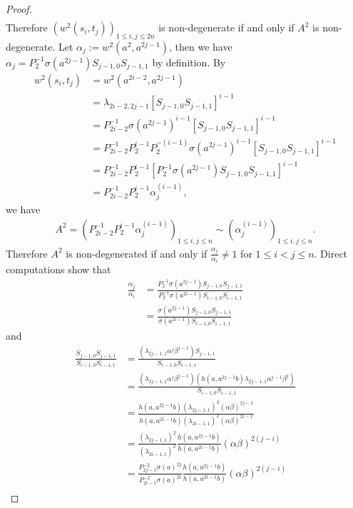\documentclass[a4paper,11pt]{amsart}
\numberwithin{equation}{section}
\begin{document}
\begin{proof}
\begin{gather*}
\end{gather*}
Therefore $(w^2(s_i,t_j))_{1\leq i,j \leq 2n}$ is non-degenerate if and only if $A^2$ is non-degenerate. Let $\alpha_j:=w^2(a^2,a^{2j-1})$, then we have $\alpha_j=P_{2}^{-1}\sigma(a^{2j-1}) S_{j-1,0} S_{j-1,1}$ by definition. By
\begin{align*}
w^2(s_{i},t_{j})&=w^2(a^{2i-2},a^{2j-1})\\
&=\lambda_{2i-2,2j-1}[S_{j-1,0} S_{j-1,1}]^{i-1}\\
&=P_{2i-2}^{-1} \sigma(a^{2j-1})^{i-1} [S_{j-1,0} S_{j-1,1}]^{i-1}\\
&=P_{2i-2}^{-1} P_{2}^{i-1} P_{2}^{-(i-1)}\sigma(a^{2j-1})^{i-1} [S_{j-1,0} S_{j-1,1}]^{i-1}\\
&=P_{2i-2}^{-1} P_{2}^{i-1} [P_{2}^{-1}\sigma(a^{2j-1}) S_{j-1,0} S_{j-1,1}]^{i-1}\\
&=P_{2i-2}^{-1} P_{2}^{i-1} \alpha_j^{(i-1)},
\end{align*}
we have
\begin{gather*}
A^2= (P_{2i-2}^{-1} P_{2}^{i-1} \alpha_j^{(i-1)})_{1 \leq i,j \leq n} \sim (\alpha_j^{(i-1)})_{1 \leq i,j \leq n}.
\end{gather*}
Therefore $A^2$ is non-degenerated if and only if $\frac{\alpha_j}{\alpha_i}\neq 1$ for $1\leq i < j\leq n$. Direct computations show that
\begin{align*}
\frac{\alpha_j}{\alpha_i}&=\frac{P_{2}^{-1}\sigma(a^{2j-1}) S_{j-1,0} S_{j-1,1}}{P_{2}^{-1}\sigma(a^{2i-1}) S_{i-1,0} S_{i-1,1}}\\
&=\frac{\sigma(a^{2j-1}) S_{j-1,0} S_{j-1,1}}{\sigma(a^{2i-1}) S_{i-1,0} S_{i-1,1}}
\end{align*}
and
\begin{align*}
\frac{S_{j-1,0} S_{j-1,1}}{S_{i-1,0} S_{i-1,1}}&=\frac{(\lambda_{2j-1,1} \alpha^j \beta^{j-1}) S_{j-1,1}}{S_{i-1,0} S_{i-1,1}}\\
&=\frac{(\lambda_{2j-1,1} \alpha^j \beta^{j-1}) (h(a,a^{2j-1}b) \lambda_{2j-1,1} \alpha^{j-1} \beta^{j}) }{S_{i-1,0} S_{i-1,1}}\\
&=\frac{h(a,a^{2j-1}b) (\lambda_{2j-1,1})^2 (\alpha \beta)^{2j-1}}{h(a,a^{2i-1}b) (\lambda_{2i-1,1})^2 (\alpha \beta)^{2i-1}}\\
&=\frac{(\lambda_{2j-1,1})^2}{(\lambda_{2i-1,1})^2} \frac{h(a,a^{2j-1}b)}{h(a,a^{2i-1}b)} (\alpha \beta)^{2(j-i)}\\
&=\frac{P_{2j-1}^{-2} \sigma(a)^{2j}}{P_{2i-1}^{-2} \sigma(a)^{2i}} \frac{h(a,a^{2j-1}b)}{h(a,a^{2i-1}b)} (\alpha \beta)^{2(j-i)}\\

\end{align*}
\end{proof}
\end{document}
